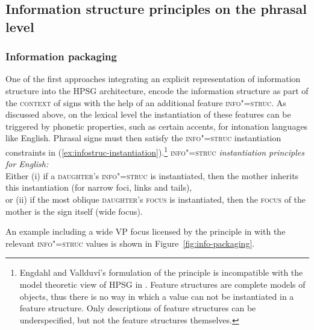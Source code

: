 \documentclass[output=paper
                ,modfonts
                ,nonflat
	        ,collection
	        ,collectionchapter
	        ,collectiontoclongg
 	        ,biblatex
                ,babelshorthands
                ,newtxmath
                ,draftmode
                ,colorlinks, citecolor=brown
]{./langsci/langscibook}
\begin{document}
\subsection{Information structure principles on the phrasal level}
\label{sec:infostruc-phrase}

\subsubsection{Information packaging \citep{EV96a}}

One of the first approaches integrating an explicit representation of
information structure into the HPSG architecture, \cite{EV96a} encode
the information structure as part of the  \textsc{context} of signs
with the help of an additional feature \textsc{info"=struc}. As
discussed above, on the lexical level the instantiation of these
features can be triggered by phonetic properties, such as certain
accents, for intonation languages like English. Phrasal signs must
then satisfy the \textsc{info"=struc} instantiation constraints in
(\ref{ex:infostruc-instantiation}).\footnote{Engdahl and Vallduví’s formulation of
the principle is incompatible with the model theoretic view of HPSG in \cite{ps2}.
Feature structures are complete models of objects, thus there is no way
in which a value can not be instantiated in a feature structure. Only descriptions
of feature structures can be underspecified, but not the feature
structures themselves.}
\ea
\label{ex:infostruc-instantiation} \textsc{info"=struc} \textit{instantiation principles for English:}\\
Either (i) if a \textsc{daughter}'s \textsc{info"=struc} is instantiated, then the mother inherits this instantiation (for narrow foci, links and tails),\\
or (ii) if the most oblique \textsc{daughter}'s \textsc{focus} is instantiated, then the \textsc{focus} of the mother is the sign itself (wide focus).
\z

An example including a wide VP focus licensed by the principle in  with
the relevant \textsc{info"=struc} values is shown in
Figure~\ref{fig:info-packaging}.
\end{document}
